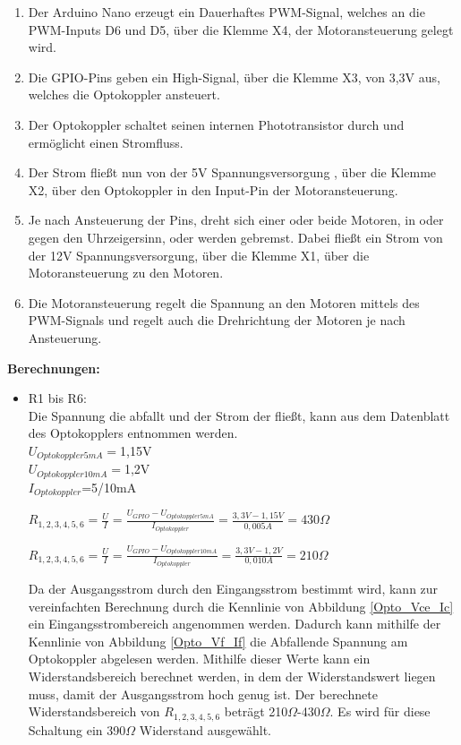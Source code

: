 \begin{enumerate}
\item Der Arduino Nano erzeugt ein Dauerhaftes PWM-Signal, welches an die PWM-Inputs D6 und D5, über die Klemme X4, der Motoransteuerung gelegt wird.
\item Die GPIO-Pins geben ein High-Signal, über die Klemme X3, von 3,3V aus, welches die Optokoppler ansteuert. 
\item Der Optokoppler schaltet seinen internen Phototransistor durch und ermöglicht einen Stromfluss.
\item Der Strom fließt nun von der 5V Spannungsversorgung , über die Klemme X2, über den Optokoppler in den Input-Pin der Motoransteuerung.
\item Je nach Ansteuerung der Pins, dreht sich einer oder beide Motoren, in oder gegen den Uhrzeigersinn, oder werden gebremst. Dabei fließt ein Strom von der 12V Spannungsversorgung, über die Klemme X1, über die Motoransteuerung zu den Motoren.
\item Die Motoransteuerung regelt die Spannung an den Motoren mittels des PWM-Signals und regelt auch die Drehrichtung der Motoren je nach Ansteuerung.
\end{enumerate}
\textbf{Berechnungen:}
\begin{itemize}
\item R1 bis R6: \\
Die Spannung die abfallt und der Strom der fließt, kann aus dem Datenblatt des Optokopplers entnommen werden.\\
$U_{Optokoppler 5mA}=$1,15V \\
$U_{Optokoppler 10mA}=$1,2V \\
$I_{Optokoppler}$=5/10mA \\

\begin{center}
$R_{1,2,3,4,5,6}=\frac{U}{I}=\frac{U_{GPIO}-U_{Optokoppler 5mA}}{I_{Optokoppler}}=\frac{3,3V-1,15V}{0,005A}=430\Omega$
\end{center}

\begin{center}
$R_{1,2,3,4,5,6}=\frac{U}{I}=\frac{U_{GPIO}-U_{Optokoppler 10mA}}{I_{Optokoppler}}=\frac{3,3V-1,2V}{0,010A}=210\Omega$
\end{center}

Da der Ausgangsstrom durch den Eingangsstrom bestimmt wird, kann zur vereinfachten Berechnung durch die Kennlinie von Abbildung \ref{Opto_Vce_Ic} ein Eingangsstrombereich angenommen werden. Dadurch kann mithilfe der Kennlinie von Abbildung \ref{Opto_Vf_If} die Abfallende Spannung am Optokoppler abgelesen werden. Mithilfe dieser Werte kann ein Widerstandsbereich berechnet werden, in dem der Widerstandswert liegen muss, damit der Ausgangsstrom hoch genug ist. Der berechnete Widerstandsbereich von $R_{1,2,3,4,5,6}$ beträgt 210$\Omega$-430$\Omega$. Es wird für diese Schaltung ein 390$\Omega$ Widerstand ausgewählt.
\end{itemize}


